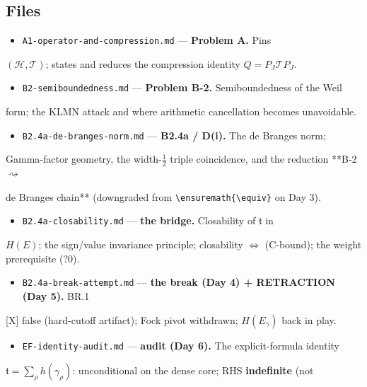 \documentclass[10pt]{article}
\begin{document}
\subsection*{Files}
\begin{itemize}
\item \texttt{A1-operator-and-compression.md} --- \textbf{Problem A.} Pins
\end{itemize}
  $(\mathcal H,\mathcal T)$; states and reduces the compression identity $Q=P_J\mathcal T P_J$.\par
\begin{itemize}
\item \texttt{B2-semiboundedness.md} --- \textbf{Problem B-2.} Semiboundedness of the Weil
\end{itemize}
  form; the KLMN attack and where arithmetic cancellation becomes unavoidable.\par
\begin{itemize}
\item \texttt{B2.4a-de-branges-norm.md} --- \textbf{B2.4a / D(i).} The de Branges norm;
\end{itemize}
  Gamma-factor geometry, the width-$\tfrac12$ triple coincidence, and the reduction **B-2 $\rightsquigarrow$\par
  de Branges chain** (downgraded from \texttt{\textbackslash{}ensuremath\{\textbackslash{}equiv\}} on Day 3).\par
\begin{itemize}
\item \texttt{B2.4a-closability.md} --- \textbf{the bridge.} Closability of $\mathfrak t$ in
\end{itemize}
  $H(E)$; the sign/value invariance principle; closability $\iff$ (C-bound); the weight prerequisite (?0).\par
\begin{itemize}
\item \texttt{B2.4a-break-attempt.md} --- \textbf{the break (Day 4) + RETRACTION (Day 5).} BR.1
\end{itemize}
  [X] false (hard-cutoff artifact); Fock pivot withdrawn; $H(E_\gamma)$ back in play.\par
\begin{itemize}
\item \texttt{EF-identity-audit.md} --- \textbf{audit (Day 6).} The explicit-formula identity
\end{itemize}
  $\mathfrak t=\sum_\rho h(\gamma_\rho)$: unconditional on the dense core; RHS \textbf{indefinite} (not\par
\end{document}
